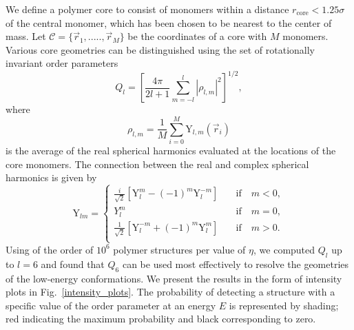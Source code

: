 \documentclass[12pt]{report}
\begin{document}
We define a polymer core to consist of monomers within a
distance $r_{\mathrm{core}} < 1.25\sigma$ of the central monomer, which has
been chosen to be nearest to the center of mass. Let $\mathcal{C} = \lbrace
\vec{r}_{1},.....,\vec{r}_{M} \rbrace $ be the coordinates of a core with
$M$ monomers. Various core geometries can be distinguished using the set of
rotationally invariant order parameters
%
\begin{equation}
Q_{l} =  \left[ \frac{4\pi}{2l + 1} \displaystyle\sum_{m =-l}^{l}
|\rho_{l,m}|^{2} \right]^{1/2},	
\end{equation}
%
where 
\begin{equation}
\rho _{l,m} = \frac{1}{M}\sum _{i = 0} ^{M} \mathrm{Y}_{l,m}(\vec{r}_{i})
\label{eq:15}
\end{equation}
%
is the average of the real spherical harmonics evaluated at the locations
of the core monomers. The connection between the real and complex spherical
harmonics is given by
% 
\begin{equation}
	\mathrm{Y}_{lm} =  \left\{
		\begin{array}{lr}
		\frac{i}{\sqrt{2}}\left[\mathrm{Y}_{l}^{m} -
(-1)^{m}\mathrm{Y}_{l}^{-m}\right] & \quad \mathrm{if} \quad  m < 0,
\\[1.5ex]
		{Y}_{l}^{m} & \quad \mathrm{if} \quad  m = 0, \\[1.5ex]
		\frac{1}{\sqrt{2}}\left[\mathrm{Y}_{l}^{-m} +
(-1)^{m}\mathrm{Y}_{l}^{m}\right] & \quad \mathrm{if} \quad  m > 0. \\
		\end{array}
	\right. 
\end{equation}
Using of the order of $10^{6}$ polymer structures per value of $\eta$, we
computed $Q_{l}$ up to $l = 6$ and found that $Q_{6}$ can be used most
effectively to resolve the geometries of the low-energy conformations. We
present the results in the form of intensity plots in
Fig.~\ref{intensity_plots}. The probability of detecting a structure with a
specific value of the order parameter at an energy $E$ is represented by
shading; red indicating the maximum probability and black corresponding to
zero. 
%
\end{document}
